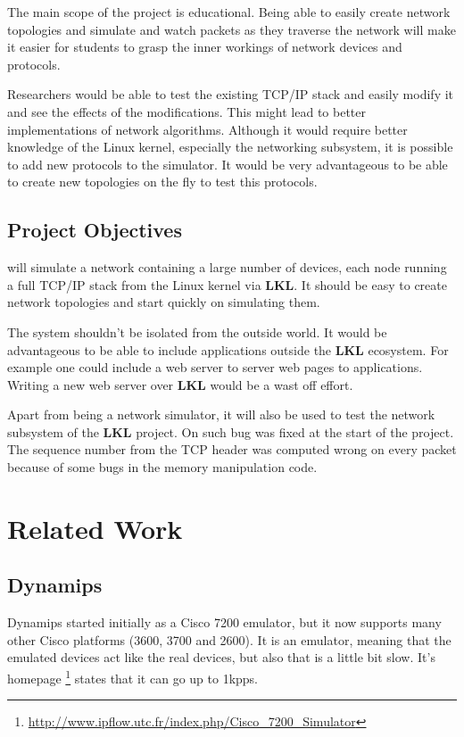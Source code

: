 The main scope of the project is educational. Being able to easily create network topologies
and simulate and watch packets as they traverse the network will make it easier for students
to grasp the inner workings of network devices and protocols.

Researchers would be able to test the existing TCP/IP stack and easily modify it and see
the effects of the modifications. This might lead to better implementations of network
algorithms. Although it would require better knowledge of the Linux kernel, especially
the networking subsystem, it is possible to add new protocols to the simulator. It would
be very advantageous to be able to create new topologies on the fly to test this protocols.

\subsection{Project Objectives}
\label{sub-sec:proj-objectives}

\textbf{\project} will simulate a network containing a large number of devices, each node
running a full TCP/IP stack from the Linux kernel via \textbf{LKL}. It should be easy to create 
network topologies and start quickly on simulating them. 

The system shouldn't be isolated from the outside world. It would be advantageous to be able
to include applications outside the \textbf{LKL} ecosystem. For example one could include
a web server to server web pages to applications. Writing a new web server over \textbf{LKL} would
be a wast off effort.

Apart from being a network simulator, it will also be used to test the network subsystem of the \textbf{LKL}
project. On such bug was fixed at the start of the project. The sequence number from the TCP header
was computed wrong on every packet because of some bugs in the memory manipulation code.

\section{Related Work}
\label{sec:proj-related}

\subsection{Dynamips}

Dynamips started initially as a Cisco 7200 emulator, but it now supports many other
Cisco platforms (3600, 3700 and 2600). It is an emulator, meaning that the emulated
devices act like the real devices, but also that is a little bit slow. It's
homepage \footnote{\url{http://www.ipflow.utc.fr/index.php/Cisco_7200_Simulator}}
states that it can go up to 1kpps. 

